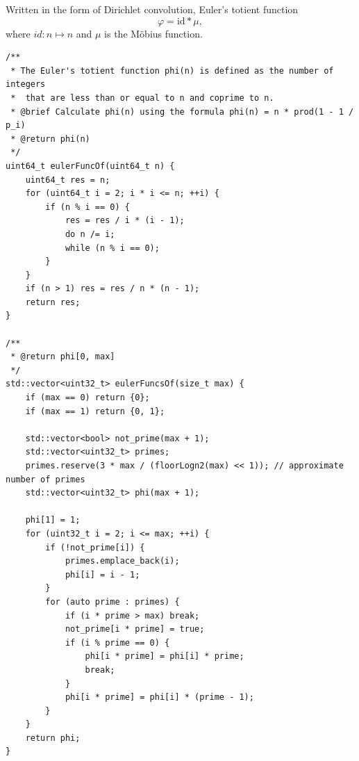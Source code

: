 \documentclass[UTF8]{article}
\begin{document}
Written in the form of Dirichlet convolution,
Euler's totient function
$$
	\varphi=\mathrm{id}*\mu,
$$
where $id:n\mapsto n$ and $\mu$ is the Möbius function.

\begin{verbatim}
/**
 * The Euler's totient function phi(n) is defined as the number of integers
 * 	that are less than or equal to n and coprime to n.
 * @brief Calculate phi(n) using the formula phi(n) = n * prod(1 - 1 / p_i)
 * @return phi(n)
 */
uint64_t eulerFuncOf(uint64_t n) {
	uint64_t res = n;
	for (uint64_t i = 2; i * i <= n; ++i) {
		if (n % i == 0) {
			res = res / i * (i - 1);
			do n /= i;
			while (n % i == 0);
		}
	}
	if (n > 1) res = res / n * (n - 1);
	return res;
}

/**
 * @return phi[0, max]
 */
std::vector<uint32_t> eulerFuncsOf(size_t max) {
	if (max == 0) return {0};
	if (max == 1) return {0, 1};

	std::vector<bool> not_prime(max + 1);
	std::vector<uint32_t> primes;
	primes.reserve(3 * max / (floorLogn2(max) << 1)); // approximate number of primes
	std::vector<uint32_t> phi(max + 1);

	phi[1] = 1;
	for (uint32_t i = 2; i <= max; ++i) {
		if (!not_prime[i]) {
			primes.emplace_back(i);
			phi[i] = i - 1;
		}
		for (auto prime : primes) {
			if (i * prime > max) break;
			not_prime[i * prime] = true;
			if (i % prime == 0) {
				phi[i * prime] = phi[i] * prime;
				break;
			}
			phi[i * prime] = phi[i] * (prime - 1);
		}
	}
	return phi;
}
\end{verbatim}
\end{document}
